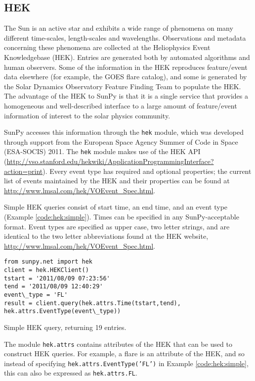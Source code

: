 \subsection{HEK}\label{ssec:hek}

The Sun is an active star and exhibits a wide range of phenomena on
many different time-scales, length-scales and wavelengths.
Observations and metadata concerning these phenomena are collected at
the Heliophysics Event Knowledgebase (HEK).  Entries are generated
both by automated algorithms and human observers.  Some of the
information in the HEK reproduces feature/event data elsewhere (for
example, the GOES flare catalog), and some is generated by the Solar
Dynamics Observatory Feature Finding Team \cite{martens2012} to
populate the HEK.  The advantage of the HEK to SunPy is that it is a
single service that provides a homogeneous and well-described
interface to a large amount of feature/event information of interest
to the solar physics community.

SunPy accesses this information through the \texttt{hek} module, which
was developed through support from the European Space Agency Summer of
Code in Space (ESA-SOCIS) 2011.  The \texttt{hek} module makes use of
the HEK API
(\url{http://vso.stanford.edu/hekwiki/ApplicationProgrammingInterface?action=print}).
Every event type has required and optional properties; the current
list of events maintained by the HEK and their properties can be found
at \url{http://www.lmsal.com/hek/VOEvent_Spec.html}.

Simple HEK queries consist of start time, an end time, and an event
type (Example \ref{code:hek:simple}). Times can be specified in any
SunPy-acceptable format. Event types are specified as upper case, two
letter strings, and are identical to the two letter abbreviations
found at the HEK website, \url{http://www.lmsal.com/hek/VOEvent_Spec.html}.

\begin{listing}[H]
\begin{verbatim}
from sunpy.net import hek
client = hek.HEKClient()
tstart = '2011/08/09 07:23:56'
tend = '2011/08/09 12:40:29'
event\_type = 'FL'
result = client.query(hek.attrs.Time(tstart,tend), 
hek.attrs.EventType(event\_type))
\end{verbatim}
\caption{Simple HEK query, returning 19 entries.}
\label{code:hek:simple}
\end{listing}

The module \texttt{hek.attrs} contains attributes of the HEK that can be used to
construct HEK queries.  For example, a flare is an attribute of the
HEK, and so instead of specifying \texttt{hek.attrs.EventType('FL')}
in Example \ref{code:hek:simple}, this can also be expressed as
\texttt{hek.attrs.FL}. 

